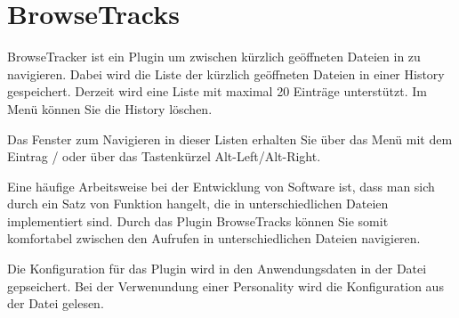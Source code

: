 \section{BrowseTracks}\label{sec:browsetracks}

BrowseTracker ist ein Plugin um zwischen kürzlich geöffneten Dateien in \codeblocks zu navigieren. Dabei wird die Liste der kürzlich geöffneten Dateien in einer History gespeichert. Derzeit wird eine Liste mit maximal 20 Einträge unterstützt. Im Menü  können Sie die History löschen.

Das Fenster  zum Navigieren in dieser Listen erhalten Sie über das Menü  mit dem Eintrag / oder über das Tastenkürzel Alt-Left/Alt-Right.

Eine häufige Arbeitsweise bei der Entwicklung von Software ist, dass man sich durch ein Satz von Funktion hangelt, die in unterschiedlichen Dateien implementiert sind. Durch das Plugin BrowseTracks können Sie somit komfortabel zwischen den Aufrufen in unterschiedlichen Dateien navigieren.

Die Konfiguration für das Plugin wird in den Anwendungsdaten in der Datei  gepseichert. Bei der Verwenundung einer Personality wird die Konfiguration aus der Datei  gelesen.
